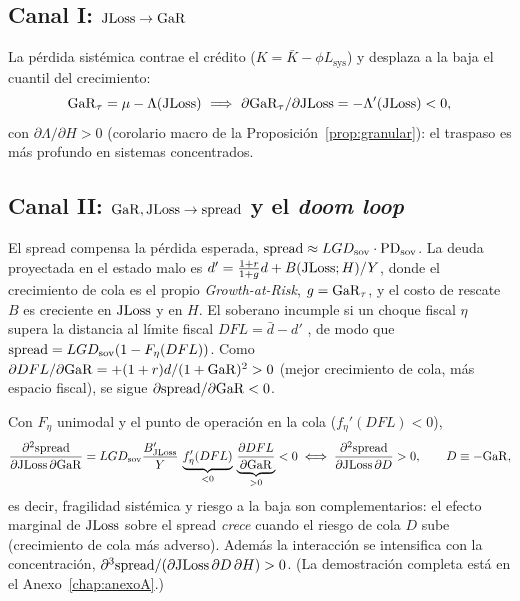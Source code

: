 \subsection{Canal I: \texorpdfstring{$\mathrm{JLoss}\to\mathrm{GaR}$}{JLoss a GaR}}\label{sec:canal1}
La pérdida sistémica contrae el crédito ($K=\bar K-\phi L_{\text{sys}}$) y desplaza a la baja el cuantil del crecimiento:
\begin{equation}
\GaR_\tau=\mu-\Lambda(\JLoss)\ \Longrightarrow\ \partial\GaR_\tau/\partial\JLoss=-\Lambda'(\JLoss)<0,
\label{eq:gar}
\end{equation}
con $\partial\Lambda/\partial H>0$ (corolario macro de la Proposición~\ref{prop:granular}): el traspaso es más profundo en sistemas concentrados.

\subsection{Canal II: \texorpdfstring{$\mathrm{GaR},\mathrm{JLoss}\to\mathrm{spread}$}{GaR, JLoss al spread} y el \textit{doom loop}}
El spread compensa la pérdida esperada, $\mathrm{spread}\approx LGD_{\text{sov}}\cdot\mathrm{PD}_{\text{sov}}$. La deuda proyectada en el estado malo es $d'=\frac{1+r}{1+g}d+B(\mathrm{JLoss};H)/Y$, donde el crecimiento de cola es el propio \textit{Growth-at-Risk}, $g=\mathrm{GaR}_\tau$, y el costo de rescate $B$ es creciente en $\mathrm{JLoss}$ y en $H$. El soberano incumple si un choque fiscal $\eta$ supera la distancia al límite fiscal $DFL=\bar d-d'$ \citep{GhoshEtAl2013}, de modo que $\mathrm{spread}=LGD_{\text{sov}}(1-F_\eta(DFL))$. Como $\partial DFL/\partial\mathrm{GaR}=+(1+r)d/(1+\mathrm{GaR})^2>0$ (mejor crecimiento de cola, más espacio fiscal), se sigue $\partial\mathrm{spread}/\partial\mathrm{GaR}<0$.

\begin{proposition}\label{prop:cross}
Con $F_\eta$ unimodal y el punto de operación en la cola ($f_\eta'(DFL)<0$),
\[
\frac{\partial^2\mathrm{spread}}{\partial\mathrm{JLoss}\,\partial \mathrm{GaR}}=LGD_{\text{sov}}\frac{B'_{\mathrm{JLoss}}}{Y}\,\underbrace{f_\eta'(DFL)}_{<0}\,\underbrace{\frac{\partial DFL}{\partial \mathrm{GaR}}}_{>0}<0
\;\Longleftrightarrow\;
\frac{\partial^2\mathrm{spread}}{\partial\mathrm{JLoss}\,\partial D}>0,\qquad D\equiv-\mathrm{GaR},
\]
es decir, fragilidad sistémica y riesgo a la baja son complementarios: el efecto marginal de $\mathrm{JLoss}$ sobre el spread \emph{crece} cuando el riesgo de cola $D$ sube (crecimiento de cola más adverso). Además la interacción se intensifica con la concentración, $\partial^3\mathrm{spread}/(\partial\mathrm{JLoss}\,\partial D\,\partial H)>0$. (La demostración completa está en el Anexo~\ref{chap:anexoA}.)
\end{proposition}

